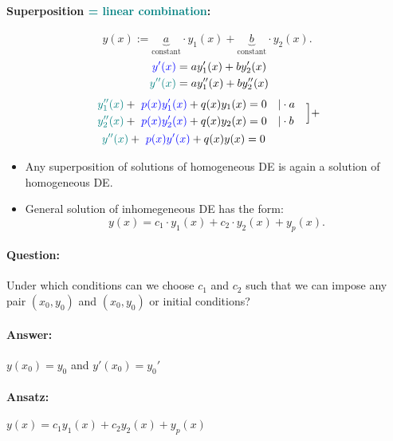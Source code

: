\documentclass[]{article}
\begin{document}
\paragraph{Superposition \textcolor{teal}{= linear combination}:}
\[
	y(x):= \underbrace{a}_ \text{constant} \cdot y_1(x) + \underbrace{b}_ \text{constant} \cdot y_2(x)
.\]
\[
\begin{split}
	\text{ \textcolor{blue}{$y'(x)$}} &= ay_1'(x)+by_2'(x)\\
	\text{ \textcolor{teal}{$y''(x)$}} &= ay_1''(x)+by_2''(x)
\end{split}
\]
\[
\begin{aligned}
\begin{aligned}
	\text{ \textcolor{teal}{$y_1''(x)$}}+\text{ \textcolor{blue}{$p(x)y_1'(x)$}}+q(x)y_1(x) &= 0\quad| \cdot a\\
	\text{ \textcolor{teal}{$y_2''(x)$}}+\text{ \textcolor{blue}{$p(x)y_2'(x)$}}+q(x)y_2(x) &= 0\quad| \cdot b
\end{aligned}
& \quad\Big]+\\
	\text{ \textcolor{teal}{$y''(x)$}}+\text{ \textcolor{blue}{$p(x)y'(x)$}}+q(x)y(x) = 0\quad\quad~~ & \\
\end{aligned}
\]
\begin{itemize}
	\item Any superposition  of solutions of homogeneous DE is again a solution of homogeneous DE.
	\item General solution of inhomegeneous DE has the form: \[
	y(x)=c_1 \cdot y_1(x)+ c_2 \cdot y_2(x) +y_p(x)
	.\]
\end{itemize}
\paragraph{Question:} Under which conditions can we choose $c_1$ and $c_2$ such that we can impose any pair $(x_0, y_0)$ and $(x_0,y_0)$ or initial conditions?
\paragraph{Answer:} $y(x_0)=y_0$ and $y'(x_0)=y_0'$
\paragraph{Ansatz:} $y(x)=c_1y_1(x)+c_2y_2(x)+y_p(x)$
\end{document}
